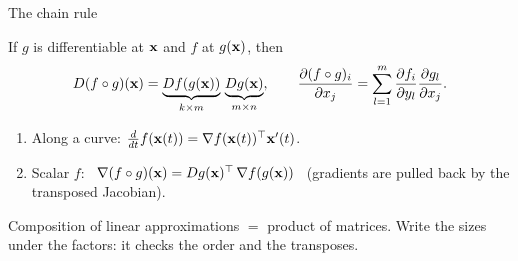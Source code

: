 \documentclass[aspectratio=1610,11pt]{beamer}
\begin{document}

\begin{frame}{The chain rule}
    \begin{theorem}
        \small If $g$ is differentiable at $\mathbf{x}$ and $f$ at $g(\mathbf{x})$, then
        \[D(f \circ g)(\mathbf{x}) = \underbrace{Df(g(\mathbf{x}))}_{k \times m}\,\underbrace{Dg(\mathbf{x})}_{m \times n}, \qquad \frac{\partial(f \circ g)_i}{\partial x_j} = \sum_{l=1}^m\frac{\partial f_i}{\partial y_l}\frac{\partial g_l}{\partial x_j}.\]
    \end{theorem}
    \begin{corollary}
        \small
        \begin{enumerate}
            \item Along a curve: $\frac{d}{dt}f(\mathbf{x}(t)) = \nabla f(\mathbf{x}(t))^\top\mathbf{x}'(t)$.
            \item Scalar $f$: \ $\nabla(f \circ g)(\mathbf{x}) = Dg(\mathbf{x})^\top\,\nabla f(g(\mathbf{x}))$ \ (gradients are pulled back by the transposed Jacobian).
        \end{enumerate}
    \end{corollary}
    \small Composition of linear approximations $=$ product of matrices. Write the sizes under the factors: it checks the order and the transposes.
\end{frame}
\end{document}
